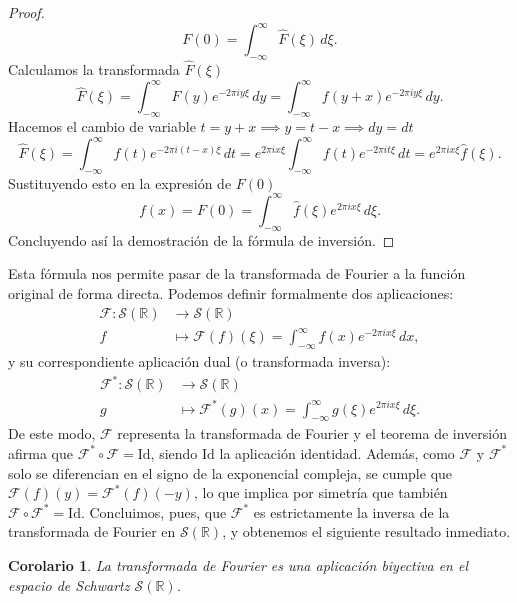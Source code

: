 \documentclass[12pt]{article}
\newcommand{\Sc}{\mathcal{S}(\mathbb{R})}
\theoremstyle{plain}
\newtheorem{corolario}[teorema]{Corolario}
\theoremstyle{definition}
\numberwithin{equation}{section}
\begin{document}
\begin{proof}
                \begin{equation*}
                    F(0) = \int_{-\infty}^{\infty} \widehat{F}(\xi) \,d\xi.
                \end{equation*}
                Calculamos la transformada \(\widehat{F}(\xi)\)
                \begin{equation*}
                    \widehat{F}(\xi) = \int_{-\infty}^{\infty} F(y)e^{-2\pi iy\xi} \,dy = \int_{-\infty}^{\infty} f(y+x)e^{-2\pi iy\xi} \,dy.
                \end{equation*}
                Hacemos el cambio de variable \(t = y+x \implies y = t-x \implies dy = dt\)
                \begin{equation*}
                    \widehat{F}(\xi) = \int_{-\infty}^{\infty} f(t)e^{-2\pi i(t-x)\xi} \,dt = e^{2\pi ix\xi} \int_{-\infty}^{\infty} f(t)e^{-2\pi it\xi} \,dt = e^{2\pi ix\xi} \hat{f}(\xi).
                \end{equation*}
                Sustituyendo esto en la expresión de \(F(0)\)
                \begin{equation*}
                    f(x) = F(0) = \int_{-\infty}^{\infty} \hat{f}(\xi)e^{2\pi ix\xi} \,d\xi.
                \end{equation*}
                Concluyendo así la demostración de la fórmula de inversión.
            \end{proof}
            Esta fórmula nos permite pasar de la transformada de Fourier a la función original de forma directa. Podemos definir formalmente dos aplicaciones:
            \begin{align*}
                \mathcal{F} \colon \Sc &\longrightarrow \Sc \\
                f &\longmapsto \mathcal{F}(f)(\xi) = \int_{-\infty}^{\infty} f(x)e^{-2\pi ix\xi} \,dx,
            \end{align*}
            y su correspondiente aplicación dual (o transformada inversa):
            \begin{align*}
                \mathcal{F}^* \colon \Sc &\longrightarrow \Sc \\
                g &\longmapsto \mathcal{F}^*(g)(x) = \int_{-\infty}^{\infty} g(\xi)e^{2\pi ix\xi} \,d\xi.
            \end{align*}
            De este modo, \(\mathcal{F}\) representa la transformada de Fourier y el teorema de inversión afirma que \(\mathcal{F}^* \circ \mathcal{F} = \text{Id}\), siendo \(\text{Id}\) la aplicación identidad. Además, como \(\mathcal{F}\) y \(\mathcal{F}^*\) solo se diferencian en el signo de la exponencial compleja, se cumple que \(\mathcal{F}(f)(y) = \mathcal{F}^*(f)(-y)\), lo que implica por simetría que también \(\mathcal{F} \circ \mathcal{F}^* = \text{Id}\). Concluimos, pues, que \(\mathcal{F}^*\) es estrictamente la inversa de la transformada de Fourier en \(\Sc\), y obtenemos el siguiente resultado inmediato.
            \begin{corolario}
                La transformada de Fourier es una aplicación biyectiva en el espacio de Schwartz \(\Sc\).
            \end{corolario}
\end{document}
